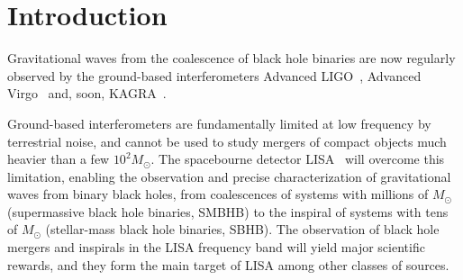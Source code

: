 \documentclass[aps,showpacs,twocolumn,prd,superscriptaddress,nofootinbib]{revtex4-1}
\newcommand{\Msol}{M_{\odot}}
\begin{document}

\maketitle


\section{Introduction}
\label{sec:intro}

%
%
%

Gravitational waves from the coalescence of black hole binaries are now regularly observed \cite{GWTC-1} by the ground-based interferometers Advanced LIGO~\cite{LIGO}, Advanced Virgo~\cite{Virgo} and, soon, KAGRA~\cite{KAGRA}.

Ground-based interferometers are fundamentally limited at low frequency by terrestrial noise, and cannot be used to study mergers of compact objects much heavier than a few $ 10^2 \Msol$. The spacebourne detector LISA~\cite{LISA2017} will overcome this limitation, enabling the observation and precise characterization of gravitational waves from binary black holes, from coalescences of systems with millions of $\Msol$ (supermassive black hole binaries, SMBHB) to the inspiral of systems with tens of $\Msol$ (stellar-mass black hole binaries, SBHB). The observation of black hole mergers and inspirals in the LISA frequency band will yield major scientific rewards, and they form the main target of LISA among other classes of sources.
\end{document}
